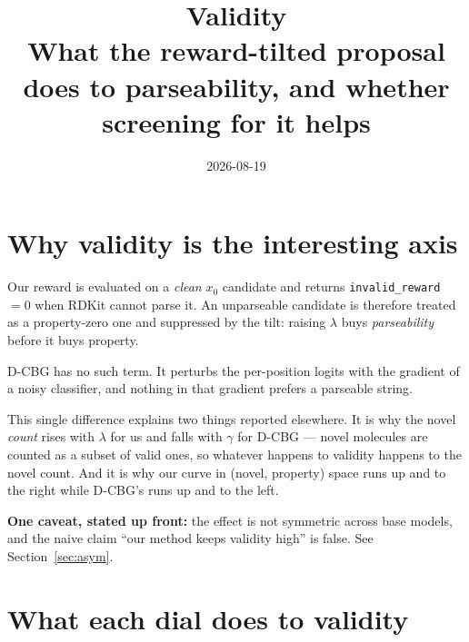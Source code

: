 \documentclass[11pt]{article}
\title{Validity\\\large What the reward-tilted proposal does to parseability, and whether screening for it helps}
\author{}\date{2026-08-19}
\begin{document}
\maketitle
\section{Why validity is the interesting axis}

Our reward is evaluated on a \emph{clean} $x_0$ candidate and returns
\texttt{invalid\_reward} $= 0$ when RDKit cannot parse it. An unparseable
candidate is therefore treated as a property-zero one and suppressed by the
tilt: raising $\lambda$ buys \emph{parseability} before it buys property.

D-CBG has no such term. It perturbs the per-position logits with the gradient of
a noisy classifier, and nothing in that gradient prefers a parseable string.

This single difference explains two things reported elsewhere. It is why the
novel \emph{count} rises with $\lambda$ for us and falls with $\gamma$ for D-CBG
--- novel molecules are counted as a subset of valid ones, so whatever happens to
validity happens to the novel count. And it is why our curve in
(novel, property) space runs up and to the right while D-CBG's runs up and to
the left.

\textbf{One caveat, stated up front:} the effect is not symmetric across base
models, and the naive claim ``our method keeps validity high'' is false. See
Section~\ref{sec:asym}.

\section{What each dial does to validity}
\begin{table}[htbp]
\centering
\small
{}
\caption{QED: valid molecules out of 1{,}024 as the strength dial is turned up. Ours along $\lambda$ at the largest $N$; D-CBG along $\gamma$.}
\label{tab:val-dial-qed}
\end{table}
\end{document}
